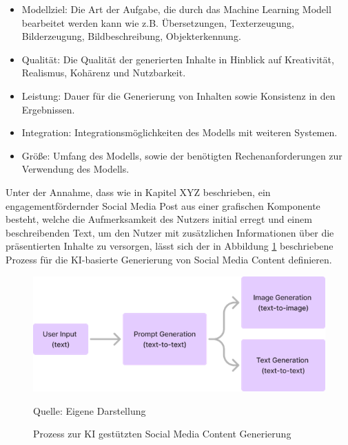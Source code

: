 \begin{itemize}
    \item Modellziel: Die Art der Aufgabe, die durch das Machine Learning Modell bearbeitet werden kann wie z.B. Übersetzungen, Texterzeugung, Bilderzeugung, Bildbeschreibung, Objekterkennung.
    \item Qualität: Die Qualität der generierten Inhalte in Hinblick auf Kreativität, Realismus, Kohärenz und Nutzbarkeit.
    \item Leistung: Dauer für die Generierung von Inhalten sowie Konsistenz in den Ergebnissen.
    \item Integration: Integrationsmöglichkeiten des Modells mit weiteren Systemen.
    \item Größe: Umfang des Modells, sowie der benötigten Rechenanforderungen zur Verwendung des Modells.
\end{itemize}

Unter der Annahme, dass wie in Kapitel XYZ beschrieben, ein engagementfördernder Social Media Post aus einer grafischen Komponente besteht, welche die Aufmerksamkeit des Nutzers initial erregt und einem beschreibenden Text, um den Nutzer mit zusätzlichen Informationen über die präsentierten Inhalte zu versorgen, lässt sich der in Abbildung \ref{fig:process_content_generation} beschriebene Prozess für die KI-basierte Generierung von Social Media Content definieren.
\begin{figure}[htbp]
    \centering
    \includegraphics[width=\textwidth]{abbildungen/Process_image_generation}
    \caption{Prozess zur KI gestützten Social Media Content Generierung}
    \label{fig:process_content_generation}
    \raggedright Quelle: Eigene Darstellung
\end{figure}



